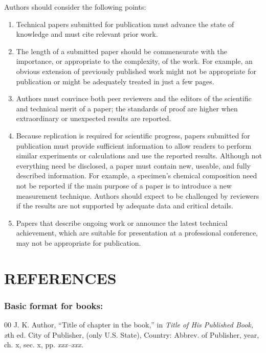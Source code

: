 \documentclass{IEEEoj-data}
\begin{document}
{Authors should consider the following points:

\begin{enumerate}
\item Technical papers submitted for publication must advance the state of knowledge and must cite relevant prior work. 
\item The length of a submitted paper should be commensurate with the importance, or appropriate to the complexity, of the work. For example, an obvious extension of previously published work might not be appropriate for publication or might be adequately treated in just a few pages.
\item Authors must convince both peer reviewers and the editors of the scientific and technical merit of a paper; the standards of proof are higher when extraordinary or unexpected results are reported. 
\item Because replication is required for scientific progress, papers submitted for publication must provide sufficient information to allow readers to perform similar experiments or calculations and use the reported results. Although not everything need be disclosed, a paper must contain new, useable, and fully described information. For example, a specimen's chemical composition need not be reported if the main purpose of a paper is to introduce a new measurement technique. Authors should expect to be challenged by reviewers if the results are not supported by adequate data and critical details.
\item Papers that describe ongoing work or announce the latest technical achievement, which are suitable for presentation at a professional conference, may not be appropriate for publication.
\end{enumerate}

\section*{REFERENCES}

\def\refname{\vadjust{\vspace*{-1em}}} %

\subsubsection*{Basic format for books:}

\begin{thebibliography}{00}
 J. K. Author, ``Title of chapter in the book,'' in \textit{Title of His Published Book, x}th ed. City of Publisher,
(only U.S. State), Country: Abbrev. of Publisher, year, ch. x, sec. x, pp.
\textit{xxx--xxx.}
\end{thebibliography}

}
\end{document}
